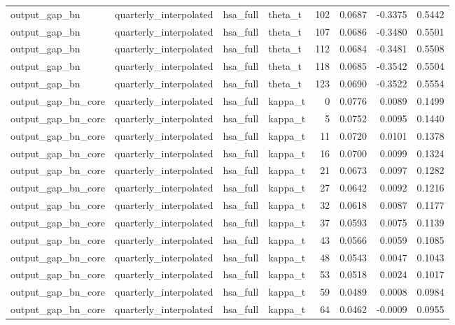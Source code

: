 \begin{tabular}{llllrrrr}
output\_gap\_bn & quarterly\_interpolated & hsa\_full & theta\_t & 102 & 0.0687 & -0.3375 & 0.5442 \\
output\_gap\_bn & quarterly\_interpolated & hsa\_full & theta\_t & 107 & 0.0686 & -0.3480 & 0.5501 \\
output\_gap\_bn & quarterly\_interpolated & hsa\_full & theta\_t & 112 & 0.0684 & -0.3481 & 0.5508 \\
output\_gap\_bn & quarterly\_interpolated & hsa\_full & theta\_t & 118 & 0.0685 & -0.3542 & 0.5504 \\
output\_gap\_bn & quarterly\_interpolated & hsa\_full & theta\_t & 123 & 0.0690 & -0.3522 & 0.5554 \\
output\_gap\_bn\_core & quarterly\_interpolated & hsa\_full & kappa\_t & 0 & 0.0776 & 0.0089 & 0.1499 \\
output\_gap\_bn\_core & quarterly\_interpolated & hsa\_full & kappa\_t & 5 & 0.0752 & 0.0095 & 0.1440 \\
output\_gap\_bn\_core & quarterly\_interpolated & hsa\_full & kappa\_t & 11 & 0.0720 & 0.0101 & 0.1378 \\
output\_gap\_bn\_core & quarterly\_interpolated & hsa\_full & kappa\_t & 16 & 0.0700 & 0.0099 & 0.1324 \\
output\_gap\_bn\_core & quarterly\_interpolated & hsa\_full & kappa\_t & 21 & 0.0673 & 0.0097 & 0.1282 \\
output\_gap\_bn\_core & quarterly\_interpolated & hsa\_full & kappa\_t & 27 & 0.0642 & 0.0092 & 0.1216 \\
output\_gap\_bn\_core & quarterly\_interpolated & hsa\_full & kappa\_t & 32 & 0.0618 & 0.0087 & 0.1177 \\
output\_gap\_bn\_core & quarterly\_interpolated & hsa\_full & kappa\_t & 37 & 0.0593 & 0.0075 & 0.1139 \\
output\_gap\_bn\_core & quarterly\_interpolated & hsa\_full & kappa\_t & 43 & 0.0566 & 0.0059 & 0.1085 \\
output\_gap\_bn\_core & quarterly\_interpolated & hsa\_full & kappa\_t & 48 & 0.0543 & 0.0047 & 0.1043 \\
output\_gap\_bn\_core & quarterly\_interpolated & hsa\_full & kappa\_t & 53 & 0.0518 & 0.0024 & 0.1017 \\
output\_gap\_bn\_core & quarterly\_interpolated & hsa\_full & kappa\_t & 59 & 0.0489 & 0.0008 & 0.0984 \\
output\_gap\_bn\_core & quarterly\_interpolated & hsa\_full & kappa\_t & 64 & 0.0462 & -0.0009 & 0.0955 \\

\end{tabular}
